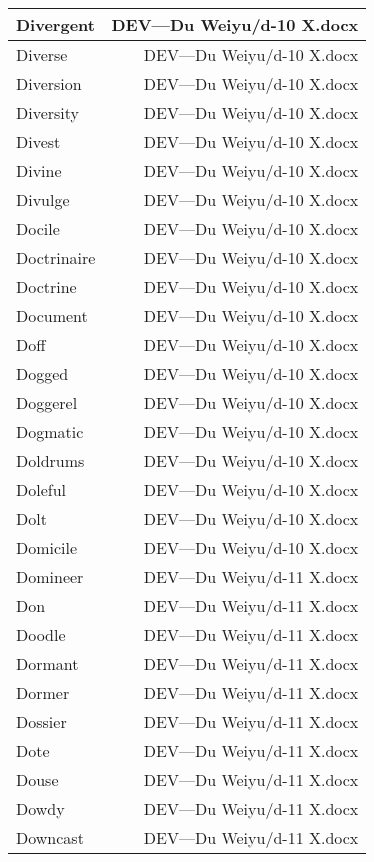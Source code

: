 \documentclass{article}
\begin{document}
\begin{center}
\begin{longtable}{|l|r|}
\hline
Divergent  &  DEV---Du Weiyu/d-10 X.docx\\  
\hline
Diverse  &  DEV---Du Weiyu/d-10 X.docx\\  
\hline
Diversion  &  DEV---Du Weiyu/d-10 X.docx\\  
\hline
Diversity  &  DEV---Du Weiyu/d-10 X.docx\\  
\hline
Divest  &  DEV---Du Weiyu/d-10 X.docx\\  
\hline
Divine  &  DEV---Du Weiyu/d-10 X.docx\\  
\hline
Divulge  &  DEV---Du Weiyu/d-10 X.docx\\  
\hline
Docile  &  DEV---Du Weiyu/d-10 X.docx\\  
\hline
Doctrinaire  &  DEV---Du Weiyu/d-10 X.docx\\  
\hline
Doctrine  &  DEV---Du Weiyu/d-10 X.docx\\  
\hline
Document  &  DEV---Du Weiyu/d-10 X.docx\\  
\hline
Doff  &  DEV---Du Weiyu/d-10 X.docx\\  
\hline
Dogged  &  DEV---Du Weiyu/d-10 X.docx\\  
\hline
Doggerel  &  DEV---Du Weiyu/d-10 X.docx\\  
\hline
Dogmatic  &  DEV---Du Weiyu/d-10 X.docx\\  
\hline
Doldrums  &  DEV---Du Weiyu/d-10 X.docx\\  
\hline
Doleful  &  DEV---Du Weiyu/d-10 X.docx\\  
\hline
Dolt  &  DEV---Du Weiyu/d-10 X.docx\\  
\hline
Domicile  &  DEV---Du Weiyu/d-10 X.docx\\  
\hline
Domineer  &  DEV---Du Weiyu/d-11 X.docx\\  
\hline
Don  &  DEV---Du Weiyu/d-11 X.docx\\  
\hline
Doodle  &  DEV---Du Weiyu/d-11 X.docx\\  
\hline
Dormant  &  DEV---Du Weiyu/d-11 X.docx\\  
\hline
Dormer  &  DEV---Du Weiyu/d-11 X.docx\\  
\hline
Dossier  &  DEV---Du Weiyu/d-11 X.docx\\  
\hline
Dote  &  DEV---Du Weiyu/d-11 X.docx\\  
\hline
Douse  &  DEV---Du Weiyu/d-11 X.docx\\  
\hline
Dowdy  &  DEV---Du Weiyu/d-11 X.docx\\  
\hline
Downcast  &  DEV---Du Weiyu/d-11 X.docx\\  

\end{longtable}
\end{center}
\end{document}
